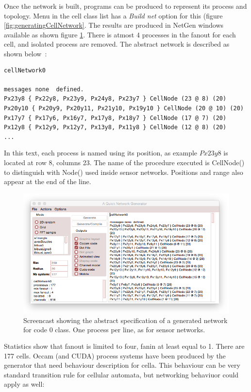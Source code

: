 Once the network is built, programs can be produced to represent its process and topology.
Menu in the cell class list has a {\sl Build net} option for this (figure \ref{fig:generatingCellNetwork}.
The results are produced in NetGen windows available as shown figure  \ref{fig:cellNetworkSample}.
There is atmost 4 processes in the fanout for each cell, and isolated process are removed.
The abstract network is described as shown below~:
\begin{lstlisting}
cellNetwork0

messages none  defined. 
Px23y8 { Px22y8, Px23y9, Px24y8, Px23y7 } CellNode (23 @ 8) (20)
Px20y10 { Px20y9, Px20y11, Px21y10, Px19y10 } CellNode (20 @ 10) (20)
Px17y7 { Px17y6, Px16y7, Px17y8, Px18y7 } CellNode (17 @ 7) (20)
Px12y8 { Px12y9, Px12y7, Px13y8, Px11y8 } CellNode (12 @ 8) (20)
...
\end{lstlisting}


In this text, each process is named using its position, as example $Px23y8$ is located at
row 8, columns 23. The name of the procedure executed is CellNode() to distinguish with Node()
used inside sensor networks. Positions and range also appear at the end of the line.


\begin{figure}[hbtp]
\begin{center} 
\includegraphics[width=12cm]{cellNetworkSample.png}
\caption{Screencast showing the abstract specification of a generated network for code 0 class.
One process per line, as for sensor networks.}
\label{fig:cellNetworkSample}
\end{center}
\end{figure}

Statistics show that fanout is limited to four, fanin at least equal to 1. There are 177 cells.
Occam (and CUDA) process systems have been produced by the generator that need
behaviour description for cella. This behaviour can be very standard transition rule
for cellular automata, but networking behaviuor could apply as well:

